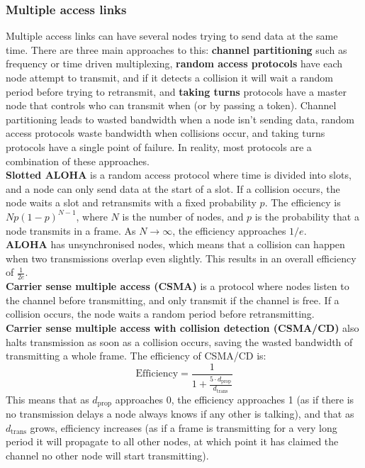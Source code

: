 \subsubsection{Multiple access links}
Multiple access links can have several nodes trying to send data at the same time. There are three main approaches to this: \textbf{channel partitioning} such as frequency or time driven multiplexing, \textbf{random access protocols} have each node attempt to transmit, and if it detects a collision it will wait a random period before trying to retransmit, and \textbf{taking turns} protocols have a master node that controls who can transmit when (or by passing a token). Channel partitioning leads to wasted bandwidth when a node isn't sending data, random access protocols waste bandwidth when collisions occur, and taking turns protocols have a single point of failure. In reality, most protocols are a combination of these approaches.\\
\textbf{Slotted ALOHA} is a random access protocol where time is divided into slots, and a node can only send data at the start of a slot. If a collision occurs, the node waits a slot and retransmits with a fixed probability $p$. The efficiency is $Np(1-p)^{N-1}$, where $N$ is the number of nodes, and $p$ is the probability that a node transmits in a frame. As $N\rightarrow\infty$, the efficiency approaches $1/e$.\\
\textbf{ALOHA} has unsynchronised nodes, which means that a collision can happen when two transmissions overlap even slightly. This results in an overall efficiency of $\frac{1}{2e}$.\\
\textbf{Carrier sense multiple access (CSMA)} is a protocol where nodes listen to the channel before transmitting, and only transmit if the channel is free. If a collision occurs, the node waits a random period before retransmitting.\\
\textbf{Carrier sense multiple access with collision detection (CSMA/CD)} also halts transmission as soon as a collision occurs, saving the wasted bandwidth of transmitting a whole frame. The efficiency of CSMA/CD is:
\[
	\text{Efficiency}=\frac{1}{1+\frac{5\cdot d_\text{prop}}{d_\text{trans}}}
\]
This means that as $d_\text{prop}$ approaches 0, the efficiency approaches 1 (as if there is no transmission delays a node always knows if any other is talking), and that as $d_\text{trans}$ grows, efficiency increases (as if a frame is transmitting for a very long period it will propagate to all other nodes, at which point it has claimed the channel no other node will start transmitting).\\
